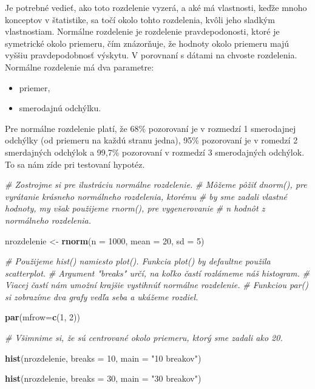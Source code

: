 \documentclass[]{article}
\newenvironment{Shaded}{\begin{snugshade}}{\end{snugshade}}
\newcommand{\CommentTok}[1]{\textcolor[rgb]{0.56,0.35,0.01}{\textit{#1}}}
\newcommand{\DataTypeTok}[1]{\textcolor[rgb]{0.13,0.29,0.53}{#1}}
\newcommand{\DecValTok}[1]{\textcolor[rgb]{0.00,0.00,0.81}{#1}}
\newcommand{\KeywordTok}[1]{\textcolor[rgb]{0.13,0.29,0.53}{\textbf{#1}}}
\newcommand{\NormalTok}[1]{#1}
\newcommand{\StringTok}[1]{\textcolor[rgb]{0.31,0.60,0.02}{#1}}
\providecommand{\tightlist}{%
  \setlength{\itemsep}{0pt}\setlength{\parskip}{0pt}}
\begin{document}
Je potrebné vedieť, ako toto rozdelenie vyzerá, a aké má vlastnosti,
keďže mnoho konceptov v štatistike, sa točí okolo tohto rozdelenia,
kvôli jeho sladkým vlastnostiam. Normálne rozdelenie je rozdelenie
pravdepodonosti, ktoré je symetrické okolo priemeru, čím znázorňuje, že
hodnoty okolo priemeru majú vyššiu pravdepodobnosť výskytu. V porovnaní
s dátami na chvoste rozdelenia. Normálne rozdelenie má dva parametre:

\begin{itemize}
\tightlist
\item
  priemer,
\item
  smerodajnú odchýlku.
\end{itemize}

Pre normálne rozdelenie platí, že 68\% pozorovaní je v rozmedzí 1
smerodajnej odchýlky (od priemeru na každú stranu jedna), 95\%
pozorovaní je v romedzí 2 smerdajných odchýlok a 99,7\% pozorovaní v
rozmedzí 3 smerodajných odchýlok. To sa nám zíde pri testovaní hypotéz.

\begin{Shaded}
\begin{Highlighting}[]
\CommentTok{# Zostrojme si pre ilustráciu normálne rozdelenie.}
\CommentTok{# Môžeme pôžiť dnorm(), pre vyrátanie krásneho normálneho rozdelenia, ktorému}
\CommentTok{# by sme zadali vlastné hodnoty, my však použijeme rnorm(), pre vygenerovanie}
\CommentTok{# n hodnôt z normálneho rozdelenia.}

\NormalTok{nrozdelenie <-}\StringTok{  }\KeywordTok{rnorm}\NormalTok{(}\DataTypeTok{n =} \DecValTok{1000}\NormalTok{, }\DataTypeTok{mean =} \DecValTok{20}\NormalTok{, }\DataTypeTok{sd =} \DecValTok{5}\NormalTok{)}

\CommentTok{# Použijeme hist() namiesto plot(). Funkcia plot() by defaultne použila scatterplot.}
\CommentTok{# Argument "breaks" určí, na koľko častí rozlámeme náš histogram.}
\CommentTok{# Viacej častí nám umožní krajšie vystihnúť normálne rozdelenie.}
\CommentTok{# Funkciou par() si zobrazíme dva grafy vedľa seba a ukážeme rozdiel.}

\KeywordTok{par}\NormalTok{(}\DataTypeTok{mfrow=}\KeywordTok{c}\NormalTok{(}\DecValTok{1}\NormalTok{, }\DecValTok{2}\NormalTok{)) }

\CommentTok{# Všimnime si, že sú centrované okolo priemeru, ktorý sme zadali ako 20.}

\KeywordTok{hist}\NormalTok{(nrozdelenie, }\DataTypeTok{breaks =} \DecValTok{10}\NormalTok{, }\DataTypeTok{main =} \StringTok{"10 breakov"}\NormalTok{)}

\KeywordTok{hist}\NormalTok{(nrozdelenie, }\DataTypeTok{breaks =} \DecValTok{30}\NormalTok{, }\DataTypeTok{main =} \StringTok{"30 breakov"}\NormalTok{)}
\end{Highlighting}
\end{Shaded}
\end{document}
